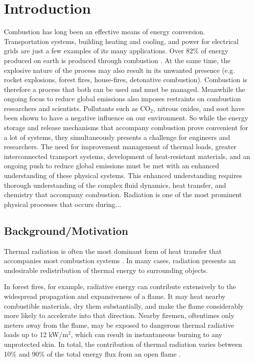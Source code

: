 \addchapheadtotoc

\chapter{Introduction} \label{chapter:Introduction}
Combustion has long been an effective means of energy conversion. Transportation systems, building heating and cooling, and power for electrical grids are just a few examples of its many applications. Over 82\% of energy produced on earth is produced through combustion \cite{2021BpEnergy}. 
At the same time, the explosive nature of the process may also result in its unwanted presence (e.g. rocket explosions, forest fires, house-fires, detonative combustion).
Combustion is therefore a process that both can be used and must be managed. 
Meanwhile the ongoing focus to reduce global emissions also imposes restraints on combustion researchers and scientists. Pollutants such as CO${}_2$, nitrous oxides, and soot have been shown to have a negative influence on our environment.
So while the energy storage and release mechanisms that accompany combustion prove convenient for a lot of systems, they simultaneously presents a challenge for engineers and researchers.
The need for improvement management of thermal loads, greater interconnected transport systems, development of heat-resistant materials, and an ongoing push to reduce global emissions must be met with an enhanced understanding of these physical systems.
This enhanced understanding requires thorough understanding of the complex fluid dynamics, heat transfer, and chemistry that accompany combustion.
Radiation is one of the most prominent physical processes that occurs during... 


\section{Background/Motivation}
Thermal radiation is often the most dominant form of heat transfer that accompanies most combustion systems \cite{Coelho2018RadiativeSystems}. In many cases, radiation presents an undesirable redistribution of thermal energy to surrounding objects.

In forest fires, for example, radiative energy can contribute extensively to the widespread propagation and expansiveness of a flame. 
It may heat nearby combustible materials, dry them substantially, and make the flame considerably more likely to accelerate into that direction. 
Nearby firemen, oftentimes only meters away from the flame, may be exposed to dangerous thermal radiative loads up to 12 kW/m$^2$, which can result in instantaneous burning to any unprotected skin.
In total, the contribution of thermal radiation varies between 10\% and 90\% of the total energy flux from an open flame \cite{Valendik2008EffectEnvironment}.

